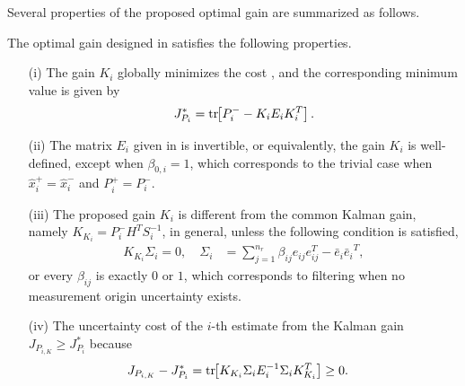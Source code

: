 Several properties of the proposed optimal gain are summarized as follows.
\begin{prop}
The optimal gain designed in  satisfies the following properties.
\begin{itemize}
\item[(i)] The gain $K_i$ globally minimizes the cost , and the corresponding minimum value is given by
\begin{align*}
J^*_{P_i} = \mathrm{tr}\negthickspace\left[ P^-_{i}-K_iE_iK_i^T \right].
\end{align*}
\item[(ii)] The matrix $E_i$ given in  is invertible, or equivalently, the gain $K_i$ is well-defined, except when $\beta_{0,i}=1$, which corresponds to the trivial case when $\hat x_i^+=\hat x_i^-$ and $P_i^+=P_i^-$.
\item[(iii)] The proposed gain $K_i$ is different from the common Kalman gain, namely $K_{K_i}=P_{i}^{-}H^T S_i^{-1}$, in general, unless the following condition is satisfied,
\begin{align*}
K_{K_i}\Sigma_i=0, \quad \Sigma_i&={\sum_{j=1}^{n_r} \beta_{ij}e_{ij}e_{ij}^T-{\bar{e}_i}}{\bar{e}_i}^T,
\end{align*}
or every $\beta_{ij}$ is exactly $0$ or $1$, which corresponds to filtering when no measurement origin uncertainty exists.
\item[(iv)] The uncertainty cost of the $i$-th estimate from the Kalman gain $J_{P_{i,K}}\geq J^*_{P_i}$ because
\begin{align*}
J_{P_{i,K}}-J^*_{P_i}&=\mathrm{tr}\negthickspace\left[ K_{K_i}\Sigma_i E_i^{-1}\Sigma_i K_{K_i}^T \right]\geq0.
\end{align*}
\end{itemize}
\end{prop}
